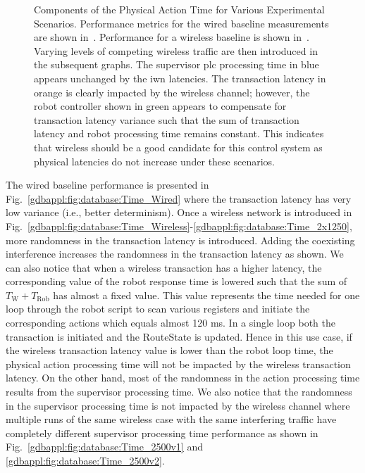 \begin{figure}[hbtp!]
	\caption{Components of the Physical Action Time for Various Experimental Scenarios. Performance metrics for the wired baseline measurements are shown in~\protect{}.  Performance for a wireless baseline is shown in~\protect{}.  Varying levels of competing wireless traffic are then introduced in the subsequent graphs.  The supervisor \gls{plc} processing time in blue appears unchanged by the \gls{iwn} latencies.  The transaction latency in orange is clearly impacted by the wireless channel; however, the robot controller shown in green appears to compensate for transaction latency variance such that the sum of transaction latency and robot processing time remains constant.  This indicates that wireless should be a good candidate for this control system as physical latencies do not increase under these scenarios. }
	\label{gdbappl:fig:database:Time}
\end{figure}

The wired baseline performance is presented in Fig.~\ref{gdbappl:fig:database:Time_Wired} where the transaction latency has very low variance (i.e., better determinism). Once a wireless network is introduced in Fig.~\ref{gdbappl:fig:database:Time_Wireless}-\ref{gdbappl:fig:database:Time_2x1250}, more randomness in the transaction latency is introduced. Adding the coexisting interference increases the randomness in the transaction latency as shown. We can also notice that when a wireless transaction has a higher latency, the corresponding value of the robot response time is lowered such that the sum of $T_\text{W}+T_\text{Rob}$ has almost a fixed value. This value represents the time needed for one loop through the robot script to scan various registers and initiate the corresponding actions which equals almost 120 ms. In a single loop both the transaction is initiated and the RouteState is updated. Hence in this use case, if the wireless transaction latency value is lower than the robot loop time, the physical action processing time will not be impacted by the wireless transaction latency. On the other hand, most of the randomness in the action processing time results from the supervisor processing time. We also notice that the randomness in the supervisor processing time is not impacted by the wireless channel where multiple runs of the same wireless case with the same interfering traffic have completely different supervisor processing time performance as shown in Fig.~\ref{gdbappl:fig:database:Time_2500v1} and \ref{gdbappl:fig:database:Time_2500v2}.   
     
